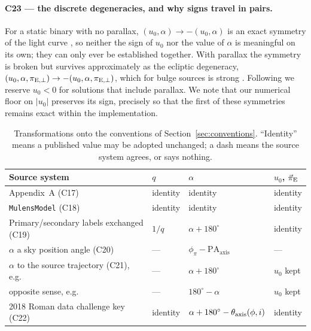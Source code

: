 \paragraph{C23 --- the discrete degeneracies, and why signs travel in
pairs.}  For a static binary with no parallax, $(u_0, \alpha) \rightarrow
-(u_0, \alpha)$ is an exact symmetry of the light curve
\citep{Skowron:2011}, so neither the sign of $u_0$ nor the value of $\alpha$
is meaningful on its own; they can only ever be established together.  With
parallax the symmetry is broken but survives approximately as the ecliptic
degeneracy, $(u_0, \alpha, \pi_{\rm E,\perp}) \rightarrow -(u_0, \alpha,
\pi_{\rm E,\perp})$, which for bulge sources is strong \citep{Smith:2003}.
Following \citet{Skowron:2011} we reserve $u_0 < 0$ for solutions that
include parallax.  We note that our numerical floor on $|u_0|$ preserves its
sign, precisely so that the first of these symmetries remains exact within
the implementation.

\begin{table}
\centering
\caption{Transformations onto the conventions of
Section~\ref{sec:conventions}.  ``Identity'' means a published value may be
adopted unchanged; a dash means the source system agrees, or says nothing.}
\label{tab:conventions}
\begin{tabular}{llll}
\hline\hline
Source system & $q$ & $\alpha$ & $u_0$, $\vec{\pi}_{\rm E}$ \\
\hline
\citet{Skowron:2011} Appendix~A (C17)         & identity & identity                        & identity \\
\texttt{MulensModel} (C18)                    & identity & identity                        & identity \\
Primary/secondary labels exchanged (C19)      & $1/q$    & $\alpha + 180^\circ$            & identity \\
$\alpha$ a sky position angle (C20)           & ---      & $\phi_\pi - \mathrm{PA_{axis}}$ & --- \\
$\alpha$ to the source trajectory (C21), e.g.\ \citet{Zang:2023} & --- & $\alpha + 180^\circ$ & $u_0$ kept \\
\quad opposite sense, e.g.\ \citet{Jung:2017} & ---      & $180^\circ - \alpha$            & $u_0$ kept \\
2018 Roman data challenge key (C22)           & identity & $\alpha + 180^\circ - \theta_{\rm axis}(\phi, i)$ & identity \\
\hline
\end{tabular}
\end{table}
